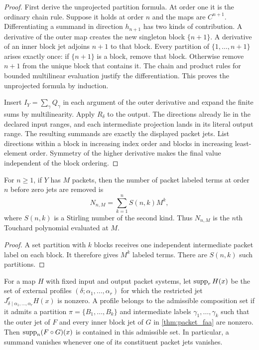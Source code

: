 \begin{proof}
First derive the unprojected partition formula. At order one it is the ordinary chain rule. Suppose it holds at order $n$ and the maps are $C^{n+1}$. Differentiating a summand in direction $h_{n+1}$ has two kinds of contribution. A derivative of the outer map creates the new singleton block $\{n+1\}$. A derivative of an inner block jet adjoins $n+1$ to that block. Every partition of $\{1,\ldots,n+1\}$ arises exactly once: if $\{n+1\}$ is a block, remove that block. Otherwise remove $n+1$ from the unique block that contains it. The chain and product rules for bounded multilinear evaluation justify the differentiation. This proves the unprojected formula by induction.

Insert $I_Y=\sum_\gamma Q_\gamma$ in each argument of the outer derivative and expand the finite sums by multilinearity. Apply $R_\delta$ to the output. The directions already lie in the declared input ranges, and each intermediate projection lands in its literal output range. The resulting summands are exactly the displayed packet jets. List directions within a block in increasing index order and blocks in increasing least-element order. Symmetry of the higher derivative makes the final value independent of the block ordering.
\end{proof}

\begin{proposition}\label{prop:faa_term_count}
For $n\ge1$, if $Y$ has $M$ packets, then the number of packet labeled terms at order $n$ before zero jets are removed is
\[
N_{n,M}
=
\sum_{k=1}^{n}S(n,k)M^k,
\]
where $S(n,k)$ is a Stirling number of the second kind.  Thus $N_{n,M}$ is the $n$th Touchard polynomial evaluated at $M$.
\end{proposition}

\begin{proof}
A set partition with $k$ blocks receives one independent intermediate packet label on each block.  It therefore gives $M^k$ labeled terms.  There are $S(n,k)$ such partitions.
\end{proof}

\begin{corollary}\label{cor:structural_pruning}
For a map $H$ with fixed input and output packet systems, let $\operatorname{supp}_r H(x)$ be the set of external profiles $(\delta;\alpha_1,\ldots,\alpha_r)$ for which the restricted jet $J^r_{\delta\mid\alpha_1,\ldots,\alpha_r}H(x)$ is nonzero. A profile belongs to the admissible composition set if it admits a partition $\pi=\{B_1,\ldots,B_k\}$ and intermediate labels $\gamma_1,\ldots,\gamma_k$ such that the outer jet of $F$ and every inner block jet of $G$ in \cref{thm:packet_faa} are nonzero. Then $\operatorname{supp}_n(F\circ G)(x)$ is contained in this admissible set. In particular, a summand vanishes whenever one of its constituent packet jets vanishes.
\end{corollary}

